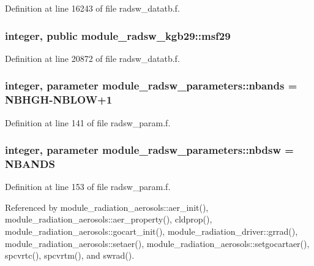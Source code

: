 Definition at line 16243 of file radsw\+\_\+datatb.\+f.

\subsubsection[{\texorpdfstring{msf29}{msf29}}]{\setlength{\rightskip}{0pt plus 5cm}integer, public module\+\_\+radsw\+\_\+kgb29\+::msf29}\hypertarget{group__module__radsw__main_gace849342fcb0d18d825318a2ee26ce0e}{}\label{group__module__radsw__main_gace849342fcb0d18d825318a2ee26ce0e}


Definition at line 20872 of file radsw\+\_\+datatb.\+f.

\subsubsection[{\texorpdfstring{nbands}{nbands}}]{\setlength{\rightskip}{0pt plus 5cm}integer, parameter module\+\_\+radsw\+\_\+parameters\+::nbands = N\+B\+H\+GH-\/N\+B\+L\+OW+1}\hypertarget{group__module__radsw__main_ga8f97b7698e8e5e2aec6e463fd09255cc}{}\label{group__module__radsw__main_ga8f97b7698e8e5e2aec6e463fd09255cc}


Definition at line 141 of file radsw\+\_\+param.\+f.

\subsubsection[{\texorpdfstring{nbdsw}{nbdsw}}]{\setlength{\rightskip}{0pt plus 5cm}integer, parameter module\+\_\+radsw\+\_\+parameters\+::nbdsw = N\+B\+A\+N\+DS}\hypertarget{group__module__radsw__main_gab1e121fde29dde00871e4a7d43be1ddb}{}\label{group__module__radsw__main_gab1e121fde29dde00871e4a7d43be1ddb}


Definition at line 153 of file radsw\+\_\+param.\+f.



Referenced by module\+\_\+radiation\+\_\+aerosols\+::aer\+\_\+init(), module\+\_\+radiation\+\_\+aerosols\+::aer\+\_\+property(), cldprop(), module\+\_\+radiation\+\_\+aerosols\+::gocart\+\_\+init(), module\+\_\+radiation\+\_\+driver\+::grrad(), module\+\_\+radiation\+\_\+aerosols\+::setaer(), module\+\_\+radiation\+\_\+aerosols\+::setgocartaer(), spcvrtc(), spcvrtm(), and swrad().

